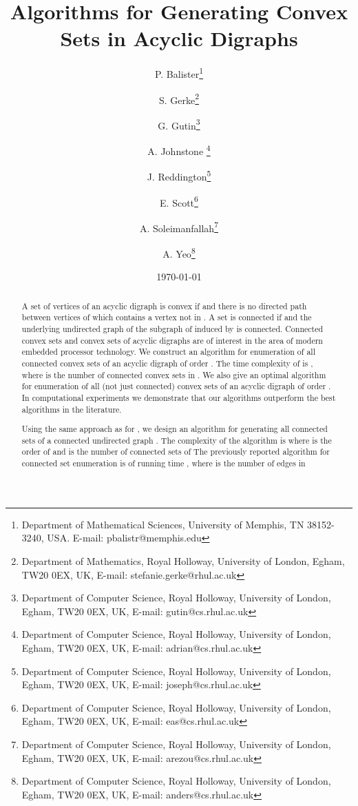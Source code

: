 \documentclass[11pt]{article}
\newcommand{\2}{\vspace{0.2 cm}}
\begin{document}
\date{\today}
\title{Algorithms for Generating Convex Sets in Acyclic Digraphs}
\author{P. Balister\thanks{Department of Mathematical Sciences,
University of Memphis, TN 38152-3240, USA. E-mail:
pbalistr@memphis.edu} \and S. Gerke\thanks{Department of Mathematics, Royal Holloway,
University of London, Egham, TW20 0EX, UK, E-mail:
stefanie.gerke@rhul.ac.uk} \and G. Gutin\thanks{Department of Computer Science, Royal Holloway,
University of London, Egham, TW20 0EX, UK, E-mail:
gutin@cs.rhul.ac.uk}\and A. Johnstone \thanks{Department of Computer Science, Royal Holloway,
University of London, Egham, TW20 0EX, UK, E-mail:
adrian@cs.rhul.ac.uk} \and J. Reddington\thanks{Department of Computer Science, Royal Holloway,
University of London, Egham, TW20 0EX, UK, E-mail:
joseph@cs.rhul.ac.uk} \and E. Scott\thanks{Department of Computer Science, Royal Holloway,
University of London, Egham, TW20 0EX, UK, E-mail:
eas@cs.rhul.ac.uk}\and A. Soleimanfallah\thanks{Department of Computer Science, Royal Holloway,
University of London, Egham, TW20 0EX, UK, E-mail:
arezou@cs.rhul.ac.uk} \and A. Yeo\thanks{Department of Computer Science, Royal Holloway,
University of London, Egham, TW20 0EX, UK, E-mail:
anders@cs.rhul.ac.uk}}

\maketitle

\begin{abstract}
A set  of vertices of an acyclic digraph  is convex if  and there is no directed path between vertices of 
which contains a vertex not in . A set  is connected if  and the underlying undirected graph of the subgraph of
 induced by  is connected. Connected convex sets and convex
sets of acyclic digraphs are of interest in the area of modern
embedded processor technology. We construct an algorithm 
for enumeration of all connected convex sets of an acyclic digraph
 of order . The time complexity of  is , where  is the number of connected convex sets in
. We also give an optimal algorithm for enumeration of all (not
just connected) convex sets of an acyclic digraph  of order .
In computational experiments we demonstrate that our algorithms
outperform the best algorithms in the literature.

Using the same approach as for , we design an algorithm for
generating all connected sets of a connected undirected graph .
The complexity of the algorithm is  where  is
the order of  and  is the number of connected sets of 
The previously reported algorithm for connected set enumeration is
of running time , where  is the number of edges
in 
\end{abstract}
\end{document}
